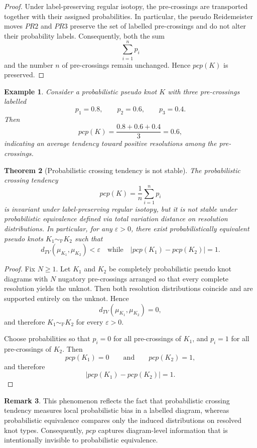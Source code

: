 \documentclass[a4paper, reqno, 12pt]{amsart}
\theoremstyle{plain}
\newtheorem{theorem}{Theorem}[section]
\newtheorem{ex}[theorem]{Example}
\theoremstyle{definition}
\newtheorem{remark}[theorem]{Remark}
\begin{document}
\begin{proof}
Under label-preserving regular isotopy, the pre-crossings are transported together with their assigned probabilities. In particular, the pseudo Reidemeister moves \(PR2\) and \(PR3\) preserve the set of labelled pre-crossings and do not alter their probability labels. Consequently, both the sum
\[
\sum_{i=1}^{n}p_i
\]
and the number \(n\) of pre-crossings remain unchanged. Hence \(pcp(K)\) is preserved.
\end{proof}

\begin{ex}\rm
Consider a probabilistic pseudo knot \(K\) with three pre-crossings labelled
\[
p_1=0.8,\qquad p_2=0.6,\qquad p_3=0.4.
\]
Then
\[
pcp(K)=\frac{0.8+0.6+0.4}{3}=0.6,
\]
indicating an average tendency toward positive resolutions among the pre-crossings.
\end{ex}

\begin{theorem}[Probabilistic crossing tendency is not stable]
The probabilistic crossing tendency
\[
pcp(K)=\frac{1}{n}\sum_{i=1}^{n}p_i
\]
is invariant under label-preserving regular isotopy, but it is not stable under probabilistic equivalence defined via total variation distance on resolution distributions. In particular, for any \(\varepsilon>0\), there exist probabilistically equivalent pseudo knots \(K_1\sim_{\mathbb P}K_2\) such that
\[
d_{TV}(\mu_{K_1},\mu_{K_2})<\varepsilon
\quad\text{while}\quad
|pcp(K_1)-pcp(K_2)|=1.
\]
\end{theorem}

\begin{proof}
Fix \(N\ge1\). Let \(K_1\) and \(K_2\) be completely probabilistic pseudo knot diagrams with \(N\) nugatory pre-crossings arranged so that every complete resolution yields the unknot. Then both resolution distributions coincide and are supported entirely on the unknot. Hence
\[
d_{TV}(\mu_{K_1},\mu_{K_2})=0,
\]
and therefore \(K_1\sim_{\mathbb P}K_2\) for every \(\varepsilon>0\).

Choose probabilities so that \(p_i=0\) for all pre-crossings of \(K_1\), and \(p_i=1\) for all pre-crossings of \(K_2\). Then
\[
pcp(K_1)=0
\qquad\text{and}\qquad
pcp(K_2)=1,
\]
and therefore
\[
|pcp(K_1)-pcp(K_2)|=1.
\]
\end{proof}

\begin{remark}\rm
This phenomenon reflects the fact that probabilistic crossing tendency measures local probabilistic bias in a labelled diagram, whereas probabilistic equivalence compares only the induced distributions on resolved knot types. Consequently, \(pcp\) captures diagram-level information that is intentionally invisible to probabilistic equivalence.
\end{remark}
\end{document}
